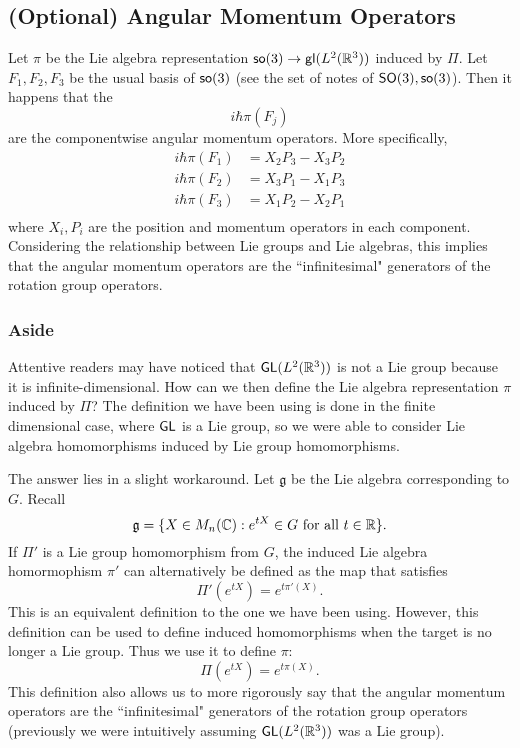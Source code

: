 \subsection{(Optional) Angular Momentum Operators}
Let $\pi$ be the Lie algebra representation $\operatorname{\textsf{so}}(3) \rightarrow \operatorname{\textsf{gl}}(L^2({\mathbb R}^3))$ induced by $\Pi$. Let $F_1, F_2, F_3$ be the usual basis of $\operatorname{\textsf{so}}(3)$ (see the set of notes of $\operatorname{\textsf{SO}}(3), \operatorname{\textsf{so}}(3)$). Then it happens that the
\[
    i\hbar\pi(F_j)
\]
are the componentwise angular momentum operators. More specifically,
\[
    \begin{split}
        i\hbar\pi(F_1) &= X_2P_3 - X_3P_2\\
        i\hbar\pi(F_2) &= X_3P_1 - X_1P_3\\
        i\hbar\pi(F_3) &= X_1P_2 - X_2P_1\\
    \end{split}
\]
where $X_i, P_i$ are the position and momentum operators in each component. Considering the relationship between Lie groups and Lie algebras, this implies that the angular momentum operators are the ``infinitesimal" generators of the rotation group operators.

\subsubsection{Aside}
Attentive readers may have noticed that $\operatorname{\textsf{GL}}(L^2({\mathbb R}^3))$ is not a Lie group because it is infinite-dimensional. How can we then define the Lie algebra representation $\pi$ induced by $\Pi$? The definition we have been using is done in the finite dimensional case, where $\operatorname{\textsf{GL}}$ is a Lie group, so we were able to consider Lie algebra homomorphisms induced by Lie group homomorphisms.

The answer lies in a slight workaround. Let $\mathfrak g$ be the Lie algebra corresponding to $G$. Recall
\[
    \mathfrak g = \{X \in M_n({\mathbb C}) : e^{tX} \in G \text{ for all } t \in {\mathbb R}\}.
\]
If $\Pi'$ is a Lie group homomorphism from $G$, the induced Lie algebra homormophism $\pi'$ can alternatively be defined as the map that satisfies
\[
    \Pi'(e^{tX}) = e^{t\pi'(X)}.
\]
This is an equivalent definition to the one we have been using. However, this definition can be used to define induced homomorphisms when the target is no longer a Lie group. Thus we use it to define $\pi$:
\[
    \Pi(e^{tX}) = e^{t\pi(X)}.
\]
This definition also allows us to more rigorously say that the angular momentum operators are the ``infinitesimal" generators of the rotation group operators (previously we were intuitively assuming $\operatorname{\textsf{GL}}(L^2({\mathbb R}^3))$ was a Lie group).

